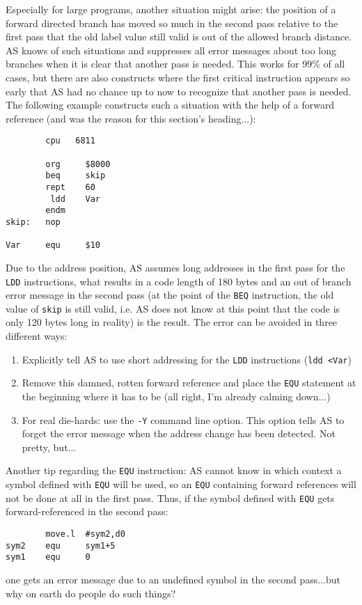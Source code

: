 \documentclass[12pt,twoside]{report}
\newcommand{\tty}[1]{{\tt #1}}
\begin{document}
Especially for large programs, another situation might arise: the
position of a forward directed branch has moved so much in the second
pass relative to the first pass that the old label value still valid
is out of the allowed branch distance.  AS knows of such situations
and suppresses all error messages about too long branches when it is
clear that another pass is needed.  This works for 99\% of all cases,
but there are also constructs where the first critical instruction
appears so early that AS had no chance up to now to recognize that
another pass is needed.  The following example constructs such a
situation with the help of a forward reference (and was the reason
for this section's heading...):
\begin{verbatim}
        cpu   6811

        org     $8000
        beq     skip
        rept    60
         ldd    Var
        endm
skip:   nop

Var     equ     $10
\end{verbatim}
Due to the address position, AS assumes long addresses in the first
pass for the \tty{LDD} instructions, what results in a code length of 180
bytes and an out of branch error message in the second pass (at the
point of the \tty{BEQ} instruction, the old value of \tty{skip} is still valid,
i.e. AS does not know at this point that the code is only 120 bytes
long in reality) is the result.  The error can be avoided in three
different ways:
\begin{enumerate}
\item{Explicitly tell AS to use short addressing for the \tty{LDD}
      instructions (\tty{ldd <Var})}
\item{Remove this damned, rotten forward reference and place the \tty{EQU}
      statement at the beginning where it has to be (all right, I'm
      already calming down...)}
\item{For real die-hards: use the \tty{-Y} command line option.  This
      option tells AS to forget the error message when the address 
      change has been detected.  Not pretty, but...}
\end{enumerate}
Another tip regarding the \tty{EQU} instruction: AS cannot know in which
context a symbol defined with \tty{EQU} will be used, so an \tty{EQU} containing
forward references will not be done at all in the first pass.  Thus,
if the symbol defined with \tty{EQU} gets forward-referenced in the second
pass:
\begin{verbatim}
        move.l  #sym2,d0
sym2    equ     sym1+5
sym1    equ     0
\end{verbatim}
one gets an error message due to an undefined symbol in the second
pass...but why on earth do people do such things?
\end{document}
